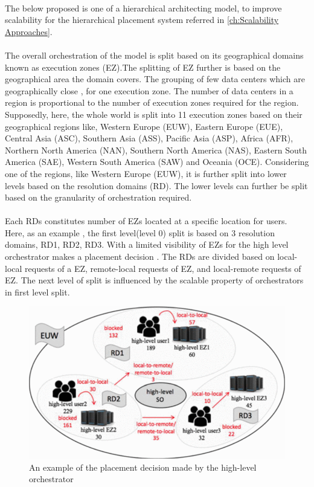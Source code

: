 \paragraph{} The below proposed is one of a hierarchical architecting model, to improve scalability for the hierarchical placement system referred in \ref{ch:Scalability Approaches}. 


\paragraph{}The overall orchestration of the model is split based on its geographical domains known as execution zones (EZ).The splitting of EZ further is based on the geographical area the domain covers. The grouping of few data centers which are geographically close , for one execution zone. The number of data centers in a region is proportional to the number of execution zones required for the region. Supposedly, here, the whole world is split into 11 execution zones based on their geographical regions like, Western Europe (EUW), Eastern Europe (EUE), Central Asia (ASC), Southern Asia (ASS), Pacific Asia (ASP), Africa (AFR), Northern North America (NAN), Southern North America (NAS), Eastern South America (SAE), Western South America (SAW) and Oceania (OCE). Considering one of the regions, like Western Europe (EUW), it is further split into lower levels based on the resolution domains (RD). The lower levels can further be split based on the granularity of orchestration required\cite{maini2016hierarchical}.

\paragraph{}Each RDs constitutes number of EZs located at a specific location for users. Here, as an example , the first level(level 0)  split is based on 3 resolution domains, RD1, RD2, RD3. With a limited visibility of EZs for the high level orchestrator makes a placement decision . The RDs are divided based on local-local requests of a EZ, remote-local requests of EZ, and local-remote requests of EZ. The next level of split is influenced by the scalable property of orchestrators in first level split\cite{maini2016hierarchical}.

\begin{figure}
	\centering
	\includegraphics[width=0.7\linewidth]{figures/HO}
	\caption{An example of the placement decision made by the high-level orchestrator \cite{maini2016hierarchical}}
	\label{fig:ho}
\end{figure}

